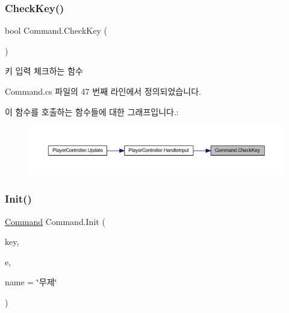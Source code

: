 \subsubsection{\texorpdfstring{CheckKey()}{CheckKey()}}
{\footnotesize\ttfamily bool Command.\+Check\+Key (\begin{DoxyParamCaption}{ }\end{DoxyParamCaption})}



키 입력 체크하는 함수 



Command.\+cs 파일의 47 번째 라인에서 정의되었습니다.


\begin{DoxyCode}{0}

\end{DoxyCode}
이 함수를 호출하는 함수들에 대한 그래프입니다.\+:\nopagebreak
\begin{figure}[H]
\begin{center}
\leavevmode
\includegraphics[width=350pt]{d5/d6a/class_command_a1f9dcd759b1d51871f8a6efd30c3a721_icgraph}
\end{center}
\end{figure}
\mbox{\label{class_command_afc8d0350d5935d74a3685f427173d62e}} 
\subsubsection{\texorpdfstring{Init()}{Init()}\hspace{0.1cm}{\footnotesize\ttfamily [1/2]}}
{\footnotesize\ttfamily \mbox{\hyperlink{class_command}{Command}} Command.\+Init (\begin{DoxyParamCaption}\item[{Key\+Code}]{key,  }\item[{\mbox{\hyperlink{class_command_acc714b5e0de57b7f24b2619fff860b9d}{Key\+Down\+Event}}}]{e,  }\item[{string}]{name = {\ttfamily \char`\"{}무제\char`\"{}} }\end{DoxyParamCaption})}



